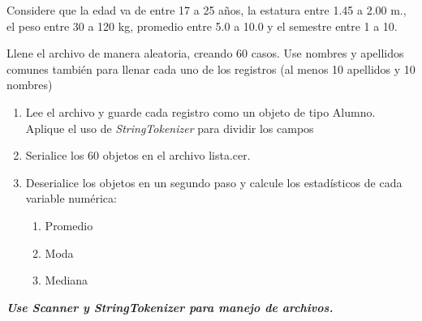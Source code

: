 \documentclass[11pt, twocolumn]{article}
\begin{document}
  Considere que la edad va de entre 17 a 25 años, la estatura entre 1.45 a 2.00 m., el peso entre 30 a 120 kg, promedio entre 5.0 a 10.0 y el semestre entre 1 a 10.

  Llene el archivo de manera aleatoria, creando 60 casos. Use nombres y apellidos comunes también para llenar cada uno de los registros (al menos 10 apellidos y 10 nombres)

  \begin{enumerate}
    \item Lee el archivo y guarde cada registro como un objeto de tipo Alumno. Aplique el uso de \textit{StringTokenizer} para dividir los campos
    \item Serialice los 60 objetos en el archivo lista.cer.
    \item Deserialice los objetos en un segundo paso y calcule los estadísticos de cada variable numérica:
    \begin{enumerate}[label=\alph*.]
      \item Promedio
      \item Moda
      \item Mediana
    \end{enumerate}
  \end{enumerate}

  \textit{\textbf{Use Scanner y StringTokenizer para manejo de archivos.}}
\end{document}
